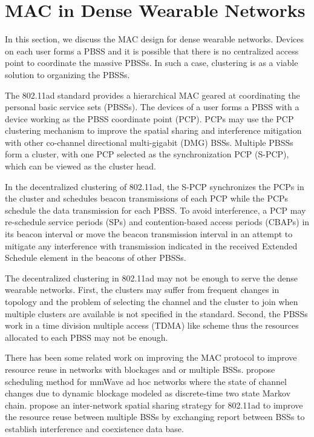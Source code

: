 \documentclass[10pt, conference, letterpaper]{IEEEtran}
\begin{document}
\section{MAC in Dense Wearable Networks}\label{section:MAC}
In this section, we discuss the MAC design for dense wearable networks. Devices on each user forms a PBSS and it is possible that there is no centralized access point to coordinate the massive PBSSs. In such a case, clustering is as a viable solution to organizing the PBSSs.

The 802.11ad standard provides a hierarchical MAC geared at coordinating the personal basic service sets (PBSSs). The devices of a user forms a PBSS with a device working as the PBSS coordinate point (PCP). PCPs may use the PCP clustering mechanism to improve the spatial sharing and interference mitigation with other co-channel directional multi-gigabit (DMG) BSSs. Multiple PBSSs form a cluster, with one PCP selected as the synchronization PCP (S-PCP), which can be viewed as the cluster head.

In the decentralized clustering of 802.11ad, the S-PCP synchronizes the PCPs in the cluster and schedules beacon transmissions of each PCP while the PCPs schedule the data transmission for each PBSS. To avoid interference, a PCP may re-schedule service periods (SPs) and contention-based access periods (CBAPs) in its beacon interval or move the beacon transmission interval in an attempt to mitigate any interference with transmission indicated in the received Extended Schedule element in the beacons of other PBSSs. 

The decentralized clustering in 802.11ad may not be enough to serve the dense wearable networks.
First, the clusters may suffer from frequent changes in topology and the problem of selecting the channel and the cluster to join when multiple clusters are available is not specified in the standard. 
Second, the PBSSs work in a time division multiple access (TDMA) like scheme thus the resources allocated to each PBSS may not be enough. 

There has been some related work on improving the MAC protocol to improve resource reuse in networks with blockages and or multiple BSSs. \cite{onlinkscheduling} propose scheduling method for mmWave ad hoc networks where the state of channel changes due to dynamic blockage modeled as discrete-time two state Markov chain. \cite{intersharing} propose an inter-network spatial sharing strategy for 802.11ad to improve the resource reuse between multiple BSSs by exchanging report between BSSs to establish interference and coexistence data base.
\end{document}
